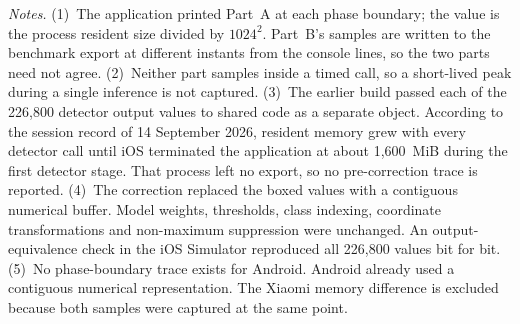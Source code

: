 {\footnotesize
\textit{Notes.} (1)~The application printed Part~A at each phase boundary;
the value is the process resident size divided by $1024^2$. Part~B's samples are written to the benchmark export at
different instants from the console lines, so the two parts need not agree.
(2)~Neither part samples inside a timed call, so a short-lived peak during a
single inference is not captured.
(3)~The earlier build passed each of the 226{,}800 detector output values to
shared code as a separate object. According to the session record of
14 September 2026, resident memory grew with every detector call until iOS
terminated the application at about 1{,}600~MiB during the first detector
stage. That process left no export, so no pre-correction trace is reported.
(4)~The correction replaced the boxed values with a contiguous numerical
buffer. Model weights, thresholds, class indexing, coordinate transformations
and non-maximum suppression were unchanged. An output-equivalence check in
the iOS Simulator reproduced all 226{,}800 values bit for bit.
(5)~No phase-boundary trace exists for Android. Android already used a
contiguous numerical representation. The Xiaomi memory difference is
excluded because both samples were captured at the same point.
\par}
\tabletail

